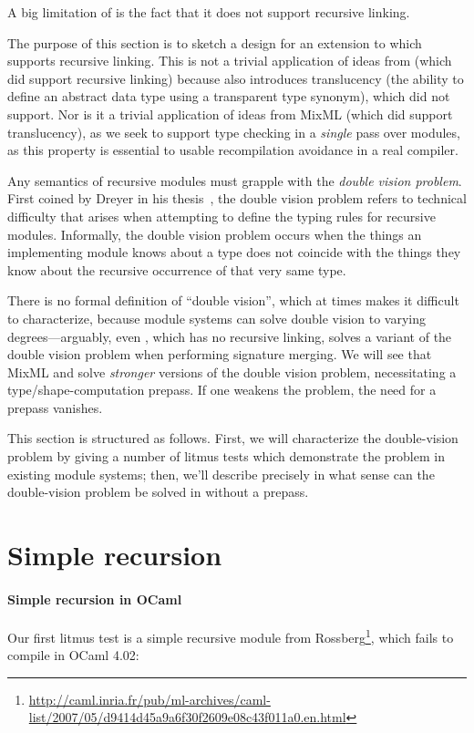 A big limitation of \Backpack{} is the fact that it does not support
recursive linking.  

The purpose of this section is to sketch a design for an extension to
\Backpack{} which supports recursive linking.  This is not a trivial
application of ideas from \OldBackpack{} (which did support recursive linking)
because \Backpack{} also introduces translucency (the ability to define
an abstract data type using a transparent type synonym), which \OldBackpack{}
did not support.  Nor is it a trivial application of ideas from MixML
(which did support translucency), as we seek to support type checking
in a \emph{single} pass over modules, as this property is essential
to usable recompilation avoidance in a real compiler.

Any semantics of recursive modules must grapple with the \emph{double
vision problem}.  First coined by Dreyer in his
thesis~\cite{dreyer:thesis}, the double vision problem refers to
technical difficulty that arises when attempting to define the typing
rules for recursive modules.  Informally, the double vision problem
occurs when the things an implementing module knows about a type does
not coincide with the things they know about the recursive occurrence of
that very same type.

There is no formal definition of ``double vision'', which at times makes
it difficult to characterize, because module systems can solve double
vision to varying degrees---arguably, even \Backpack{}, which has no
recursive linking, solves a variant of the double vision problem when
performing signature merging.  We will see that MixML and \OldBackpack{}
solve \emph{stronger} versions of the double vision problem, necessitating
a type/shape-computation prepass.  If one weakens the problem, the
need for a prepass vanishes.

This section is structured as follows.  First, we will characterize the
double-vision problem by giving a number of litmus tests which
demonstrate the problem in existing module systems; then, we'll describe
precisely in what sense can the double-vision problem be solved in
\Backpack{} without a prepass.

\section{Simple recursion}

\paragraph{Simple recursion in OCaml}  Our first litmus test is a simple
recursive module from Rossberg\footnote{\url{http://caml.inria.fr/pub/ml-archives/caml-list/2007/05/d9414d45a9a6f30f2609e08c43f011a0.en.html}}, which fails to compile in OCaml 4.02:

